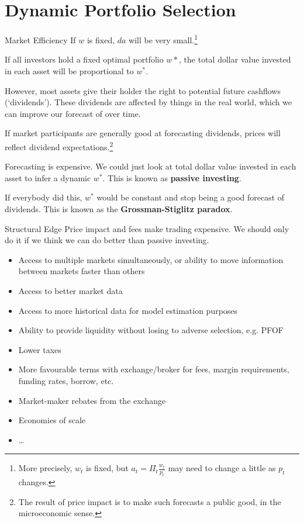 \documentclass{beamer}
\newcommand{\sectionquote}[1]{\def\insertsquote{#1}}
\newcommand{\insertsquote}{}
\renewcommand{\insertsquote}{}
\begin{document}
\sectionquote{``Values which do not `yet' exist, except as probabilistic estimations, or risk structures, acquire a power of command over economic (and therefore social) processes, necessarily devalorizing the actual.'' Nick Land, Teleoplexy}
\section{Dynamic Portfolio Selection}
\begin{frame}{Market Efficiency}
	If $w$ is fixed, $da$ will be very small.\footnote{More precisely, $w_t$ is fixed, but $a_t=\Pi_t \frac{w_t}{p_t}$ may need to change a little as $p_t$ changes.}

	If all investors hold a fixed optimal portfolio $w*$, the total dollar value invested in each asset will be proportional to $w^*$.

	However, most assets give their holder the right to potential future cashflows (`dividends'). %
	These dividends are affected by things in the real world, which we can improve our forecast of over time.

	If market participants are generally good at forecasting dividends, prices will reflect dividend expectations.\footnote{The result of price impact is to make such forecasts a public good, in the microeconomic sense.}

	Forecasting is expensive. We could just look at total dollar value invested in each asset to infer a dynamic $w^*$. This is known as \textbf{passive investing}.

	If everybody did this, $w^*$ would be constant and stop being a good forecast of dividends. This is known as the \textbf{Grossman-Stiglitz paradox}.
\end{frame}

\begin{frame}{Structural Edge}
	Price impact and fees make trading expensive. We should only do it if we think we can do better than passive investing.

	\begin{itemize}
		\item Access to multiple markets simultaneously, or ability to move information between markets faster than others%
		\item Access to better market data
		\item Access to more historical data for model estimation purposes
		\item Ability to provide liquidity without losing to adverse selection, e.g. PFOF
		\item Lower taxes
		\item More favourable terms with exchange/broker for fees, margin requirements, funding rates, borrow, etc.
		\item Market-maker rebates from the exchange
		\item Economies of scale
		\item \ldots
	\end{itemize}
\end{frame}
\end{document}
